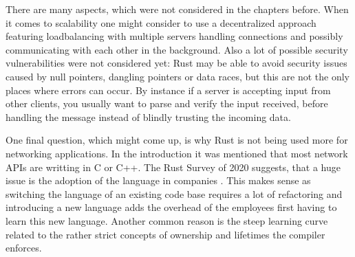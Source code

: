 There are many aspects, which were not considered in the chapters before. When it comes to scalability one might
consider to use a decentralized approach featuring loadbalancing with multiple servers handling connections and
possibly communicating with each other in the background. Also a lot of possible security vulnerabilities were not
considered yet: Rust may be able to avoid security issues caused by null pointers, dangling pointers or data races, but
this are not the only places where errors can occur. By instance if a server is accepting input from other clients, you
usually want to parse and verify the input received, before handling the message instead of blindly trusting the
incoming data.

One final question, which might come up, is why Rust is not being used more for networking applications. In the
introduction it was mentioned that most network APIs are writting in C or C++. The Rust Survey of 2020 suggests, that a
huge issue is the adoption of the language in companies \cite{rust-survey}. This makes sense as switching the language
of an existing code base requires a lot of refactoring and introducing a new language adds the overhead of the
employees first having to learn this new language. Another common reason is the steep learning curve related to the
rather strict concepts of ownership and lifetimes the compiler enforces.
